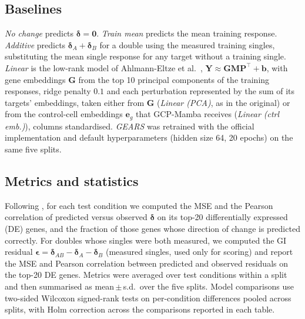 \subsection{Baselines}
\emph{No change} predicts $\boldsymbol{\delta}=\mathbf{0}$. \emph{Train mean}
predicts the mean training response. \emph{Additive} predicts
$\boldsymbol{\delta}_A+\boldsymbol{\delta}_B$ for a double using the measured
training singles, substituting the mean single response for any target without a
training single. \emph{Linear} is the low-rank model of Ahlmann-Eltze et al.\
\citep{ahlmann2025}, $\mathbf{Y}\approx\mathbf{G}\mathbf{M}\mathbf{P}^{\top}+\mathbf{b}$,
with gene embeddings $\mathbf{G}$ from the top 10 principal components of the
training responses, ridge penalty $0.1$ and each perturbation represented by the
sum of its targets' embeddings, taken either from $\mathbf{G}$ (\emph{Linear
(PCA)}, as in the original) or from the control-cell embeddings $\mathbf{e}_g$ that
GCP-Mamba receives (\emph{Linear (ctrl emb.)}), columns standardised. \emph{GEARS} was retrained with
the official implementation and default hyperparameters (hidden size 64, 20
epochs) on the same five splits.

\subsection{Metrics and statistics}
Following \citet{roohani2024}, for each test condition we computed the MSE and the
Pearson correlation of predicted versus observed $\boldsymbol{\delta}$ on its top-20
differentially expressed (DE) genes, and the fraction of those genes whose
direction of change is predicted correctly. For doubles whose singles were both
measured, we computed the GI residual
$\boldsymbol{\epsilon}=\boldsymbol{\delta}_{AB}-\boldsymbol{\delta}_A-\boldsymbol{\delta}_B$
(measured singles, used only for scoring) and report the MSE and Pearson
correlation between predicted and observed residuals on the top-20 DE genes.
Metrics were averaged over test conditions within a split and then summarised as
mean\,$\pm$\,s.d.\ over the five splits. Model comparisons use two-sided Wilcoxon
signed-rank tests on per-condition differences pooled across splits, with
Holm correction across the comparisons reported in each table.
